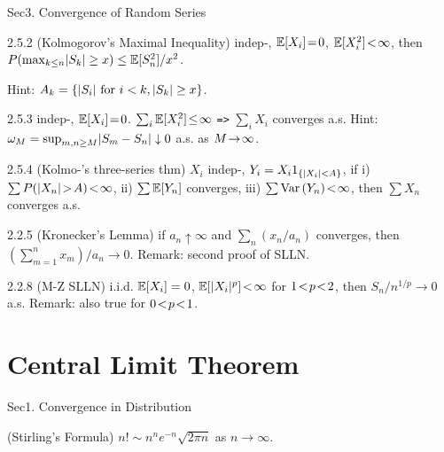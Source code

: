 Sec3. Convergence of Random Series \hrulefill

\begin{thm}{2.5.2} (Kolmogorov's Maximal Inequality)
    \newline 
    indep-, $\mathbb{E}[X_i] \!=\! 0$, $\mathbb{E}[X_i^2] \!<\! \infty$, then $P ( \max_{k\leq n} \lvert S_k \rvert \geq x ) \leq \mathbb{E}[S_n^2] / x^2 $.
    
    Hint: $A_k = \{\lvert S_i \rvert \text{ for } i < k, \lvert S_k \rvert \geq x\}$.
\end{thm}

\begin{thm}{2.5.3}
    indep-, $\mathbb{E}[X_i] \!=\! 0$. $\sum_i \mathbb{E}[X_i^2] \!\leq\! \infty$ \verb|=>| $\sum_i X_i$ converges a.s. 
    \newline
    Hint: $\omega_M = \sup_{m, n \geq M} \lvert S_m - S_n \rvert \downarrow 0$ a.s. as $M \!\rightarrow\! \infty$.
\end{thm}

\begin{thm}{2.5.4} (Kolmo-'s three-series thm) 
    $X_i$ indep-, $Y_i = X_i 1_{\{\lvert X_i \rvert < A\}}$, 
    if i) $\sum P ( \lvert X_n \rvert \!>\! A ) \!<\! \infty$, ii) $\sum \mathbb{E}[Y_n]$ converges, iii) $\sum \text{Var}\left( Y_n \right) \!<\! \infty$, 
    \newline then $\sum X_n$ converges a.s.
\end{thm}

\begin{thm}{2.2.5} (Kronecker's Lemma)
    if $a_n \uparrow \infty$ and $\sum_n\! (x_n / a_n)$ converges, then $(\sum_{m=1}^n \! x_m) / a_n \rightarrow 0$. Remark: second proof of SLLN.
\end{thm}

\begin{thm}{2.2.8} (M-Z SLLN) 
i.i.d. $\mathbb{E}[X_i] = 0$, $\mathbb{E}[\lvert X_i \rvert^p] \!<\! \infty$ for $1 \!<\! p \!<\! 2$, then $S_n / n^{1/p} \rightarrow 0$ a.s.  Remark: also true for $0 \!<\! p \!<\! 1$.
\end{thm}


\section*{Central Limit Theorem}

\vspace{-1em}

Sec1. Convergence in Distribution \hrulefill

\begin{thm}{} (Stirling's Formula)
    $n ! \sim n^n e^{-n} \sqrt{2 \pi n}$ as $n \rightarrow \infty$.
\end{thm}

